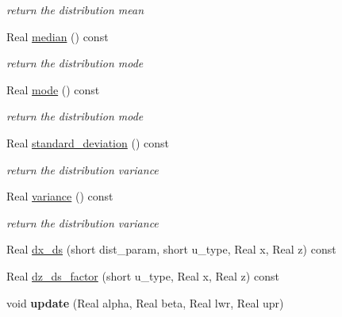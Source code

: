 \begin{DoxyCompactItemize}
\begin{DoxyCompactList}\small\item\em return the distribution mean \end{DoxyCompactList}\item 
Real \hyperlink{classPecos_1_1BetaRandomVariable_ae1fff19ce29a79d657043a598523635d}{median} () const \label{classPecos_1_1BetaRandomVariable_ae1fff19ce29a79d657043a598523635d}

\begin{DoxyCompactList}\small\item\em return the distribution mode \end{DoxyCompactList}\item 
Real \hyperlink{classPecos_1_1BetaRandomVariable_a72d3d6926edd929cb3f8e12baa655f70}{mode} () const \label{classPecos_1_1BetaRandomVariable_a72d3d6926edd929cb3f8e12baa655f70}

\begin{DoxyCompactList}\small\item\em return the distribution mode \end{DoxyCompactList}\item 
Real \hyperlink{classPecos_1_1BetaRandomVariable_a6a4ed9624d511f8a4e4f509c82cb0706}{standard\+\_\+deviation} () const \label{classPecos_1_1BetaRandomVariable_a6a4ed9624d511f8a4e4f509c82cb0706}

\begin{DoxyCompactList}\small\item\em return the distribution variance \end{DoxyCompactList}\item 
Real \hyperlink{classPecos_1_1BetaRandomVariable_a4b8b05b2a9af92dad9cc304c2925a4eb}{variance} () const \label{classPecos_1_1BetaRandomVariable_a4b8b05b2a9af92dad9cc304c2925a4eb}

\begin{DoxyCompactList}\small\item\em return the distribution variance \end{DoxyCompactList}\item 
Real \hyperlink{classPecos_1_1BetaRandomVariable_af889af8adfb262c9b74f573b2a9ffc99}{dx\+\_\+ds} (short dist\+\_\+param, short u\+\_\+type, Real x, Real z) const 
\item 
Real \hyperlink{classPecos_1_1BetaRandomVariable_af6b5fc528523180bed5fc3008dcea205}{dz\+\_\+ds\+\_\+factor} (short u\+\_\+type, Real x, Real z) const 
\item 
void {\bfseries update} (Real alpha, Real beta, Real lwr, Real upr)\label{classPecos_1_1BetaRandomVariable_a3c80355aecb28e989e2bc0124f5eff16}

\end{DoxyCompactItemize}
